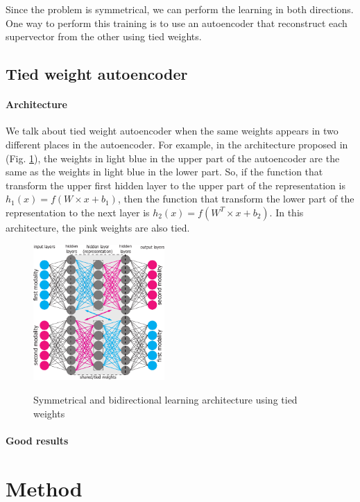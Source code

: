 \documentclass[conference]{IEEEtran}
\begin{document}
Since the problem is symmetrical, we can perform the learning in both directions. One way to perform this training is to use an autoencoder that reconstruct each supervector from the other using tied weights.

\subsection{Tied weight autoencoder}

\paragraph{Architecture}

We talk about tied weight autoencoder when the same weights appears in two different places in the autoencoder. For example, in the architecture proposed in \cite{vukotic:hal-01314302}
(Fig. \ref{archi_vedran}), the weights in light blue in the upper part of the autoencoder are the same as the weights in light blue in the lower part. So, if the function that transform the upper first hidden layer to the upper part of the representation is $h_1(x) = f(W \times x + b_1)$, then  the function that transform the lower part of the representation to the next layer is $h_2(x) = f(W^T \times x + b_2)$. In this architecture, the pink weights are also tied.

\begin{figure}[!h]
    \centering
    \caption{Symmetrical and bidirectional learning architecture using tied weights}
    \includegraphics[width=5cm]{archi-vedran.pdf}
    \label{archi_vedran}
\end{figure}

\paragraph{Good results}

\section{Method}
\end{document}

